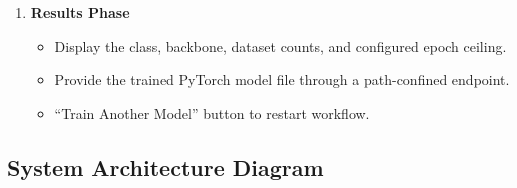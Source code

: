 \documentclass[12pt, letterpaper]{article}
\begin{document}
\begin{enumerate}
  \item \textbf{Results Phase}
    \begin{itemize}
      \item Display the class, backbone, dataset counts, and configured epoch ceiling.
      \item Provide the trained PyTorch model file through a path-confined endpoint.
      \item ``Train Another Model'' button to restart workflow.
    \end{itemize}
\end{enumerate}

\subsection{System Architecture Diagram}
\end{document}
